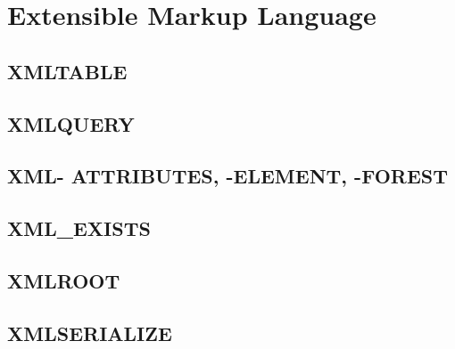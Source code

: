 \section[XML]{Extensible Markup Language}
\label{sec:xml}

\subsection{XMLTABLE}
\label{sec:xml.xml_table}

\subsection{XMLQUERY}
\label{sec:xml.xml_query}

\subsection{XML- ATTRIBUTES, -ELEMENT, -FOREST}
\label{sec:xml.xml_attr-ele-fore}

\subsection{XML\_EXISTS}
\label{sec:xml.xml_exists}

\subsection{XMLROOT}
\label{sec:xml.xml_root}

\subsection{XMLSERIALIZE}
\label{sec:xml.xml_serialize}

